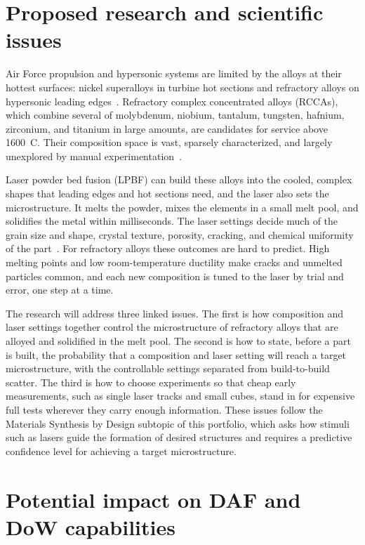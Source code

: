 \documentclass[12pt,letterpaper]{article}
\newcommand{\degC}{\textdegree{}C}
\begin{document}
\section{Proposed research and scientific issues}

Air Force propulsion and hypersonic systems are limited by the alloys at their
hottest surfaces: nickel superalloys in turbine hot sections and refractory
alloys on hypersonic leading edges~\cite{pollock2006,peters2024}. Refractory
complex concentrated alloys (RCCAs), which combine several of molybdenum,
niobium, tantalum, tungsten, hafnium, zirconium, and titanium in large
amounts, are candidates for service above 1600~\degC. Their composition space
is vast, sparsely characterized, and largely unexplored by manual
experimentation~\cite{senkov2018}.

Laser powder bed fusion (LPBF) can build these alloys into the cooled,
complex shapes that leading edges and hot sections need, and the laser also
sets the microstructure. It melts the powder, mixes the elements in a small
melt pool, and solidifies the metal within milliseconds. The laser settings
decide much of the grain size and shape, crystal texture, porosity, cracking,
and chemical uniformity of the part~\cite{debroy2018}. For refractory alloys
these outcomes are hard to predict. High melting points and low
room-temperature ductility make cracks and unmelted particles common, and each
new composition is tuned to the laser by trial and error, one step at a time.

The research will address three linked issues. The first is how composition
and laser settings together control the microstructure of refractory alloys
that are alloyed and solidified in the melt pool. The second is how to state,
before a part is built, the probability that a composition and laser setting
will reach a target microstructure, with the controllable settings separated
from build-to-build scatter. The third is how to choose experiments so that
cheap early measurements, such as single laser tracks and small cubes, stand
in for expensive full tests wherever they carry enough information. These
issues follow the Materials Synthesis by Design subtopic of this portfolio,
which asks how stimuli such as lasers guide the formation of desired
structures and requires a predictive confidence level for achieving a target
microstructure.

\section{Potential impact on DAF and DoW capabilities}
\end{document}
